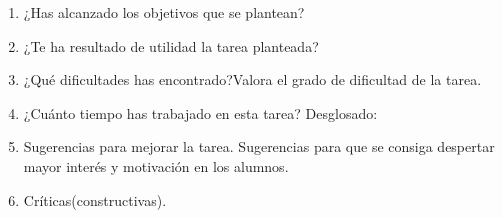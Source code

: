 \documentclass[10pt,a4paper]{article}
\begin{document}
\begin{enumerate}

	\item ¿Has alcanzado los objetivos que se plantean? 
	
	\item ¿Te ha resultado de utilidad la tarea planteada?

	\item ¿Qué dificultades has encontrado?Valora el grado de dificultad de la tarea.

	\item  ¿Cuánto tiempo has trabajado en esta tarea? Desglosado:

		\begin{table}[H]
		\centering
		\end{table}

	\item  Sugerencias para mejorar la tarea. Sugerencias para que se consiga
	despertar mayor interés y motivación en los alumnos.\par

	\item  Críticas(constructivas).

\end{enumerate} 

\newpage




\end{document}
